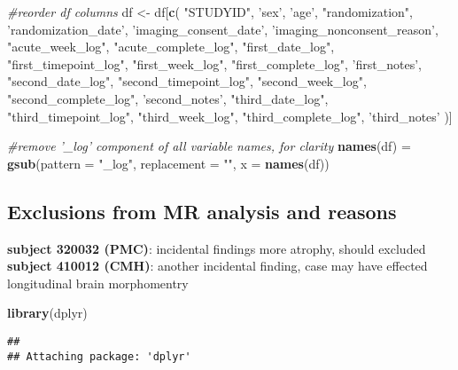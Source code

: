 \documentclass[]{article}
\newenvironment{Shaded}{\begin{snugshade}}{\end{snugshade}}
\newcommand{\KeywordTok}[1]{\textcolor[rgb]{0.13,0.29,0.53}{\textbf{#1}}}
\newcommand{\DataTypeTok}[1]{\textcolor[rgb]{0.13,0.29,0.53}{#1}}
\newcommand{\StringTok}[1]{\textcolor[rgb]{0.31,0.60,0.02}{#1}}
\newcommand{\CommentTok}[1]{\textcolor[rgb]{0.56,0.35,0.01}{\textit{#1}}}
\newcommand{\NormalTok}[1]{#1}
\theoremstyle{definition}
\theoremstyle{definition}
\theoremstyle{definition}
\theoremstyle{remark}
\begin{document}
\begin{Shaded}
\begin{Highlighting}[]
\CommentTok{#reorder df columns}
\NormalTok{df <-}\StringTok{ }\NormalTok{df[}\KeywordTok{c}\NormalTok{(}
  \StringTok{"STUDYID"}\NormalTok{, }
  \StringTok{'sex'}\NormalTok{,}
  \StringTok{'age'}\NormalTok{,}
  \StringTok{"randomization"}\NormalTok{, }
  \StringTok{'randomization_date'}\NormalTok{,  }
  \StringTok{'imaging_consent_date'}\NormalTok{,}
  \StringTok{'imaging_nonconsent_reason'}\NormalTok{,}
  \StringTok{"acute_week_log"}\NormalTok{,       }
  \StringTok{"acute_complete_log"}\NormalTok{,   }
  \StringTok{"first_date_log"}\NormalTok{, }
  \StringTok{"first_timepoint_log"}\NormalTok{, }
  \StringTok{"first_week_log"}\NormalTok{,  }
  \StringTok{"first_complete_log"}\NormalTok{,}
  \StringTok{'first_notes'}\NormalTok{,}
  \StringTok{"second_date_log"}\NormalTok{,}
  \StringTok{"second_timepoint_log"}\NormalTok{, }
  \StringTok{"second_week_log"}\NormalTok{,  }
  \StringTok{"second_complete_log"}\NormalTok{, }
  \StringTok{'second_notes'}\NormalTok{,}
  \StringTok{"third_date_log"}\NormalTok{,  }
  \StringTok{"third_timepoint_log"}\NormalTok{,  }
  \StringTok{"third_week_log"}\NormalTok{, }
  \StringTok{"third_complete_log"}\NormalTok{,   }
  \StringTok{'third_notes'}
\NormalTok{)]      }

\CommentTok{#remove '_log' component of all variable names, for clarity}
\KeywordTok{names}\NormalTok{(df) =}\StringTok{ }\KeywordTok{gsub}\NormalTok{(}\DataTypeTok{pattern =} \StringTok{"_log"}\NormalTok{, }\DataTypeTok{replacement =} \StringTok{""}\NormalTok{, }\DataTypeTok{x =} \KeywordTok{names}\NormalTok{(df))}
\end{Highlighting}
\end{Shaded}

\subsection{Exclusions from MR analysis and
reasons}\label{exclusions-from-mr-analysis-and-reasons}

\textbf{subject 320032 (PMC)}: incidental findings more atrophy, should
excluded \textbf{subject 410012 (CMH)}: another incidental finding, case
may have effected longitudinal brain morphomentry

\begin{Shaded}
\begin{Highlighting}[]
\KeywordTok{library}\NormalTok{(dplyr)}
\end{Highlighting}
\end{Shaded}

\begin{verbatim}
## 
## Attaching package: 'dplyr'
\end{verbatim}
\end{document}
